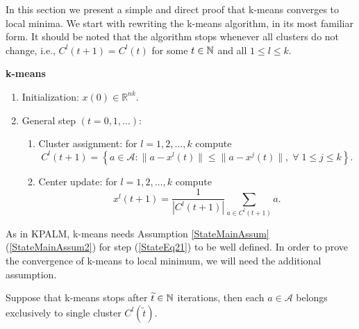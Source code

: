 In this section we present a simple and direct proof that k-means converges to local minima. We start with rewriting the k-means algorithm, in its most familiar form. It should be noted that the algorithm stops whenever all clusters do not change, i.e., $C^l(t+1)=C^l(t)$ for some $t \in \mathbb{N}$ and all $1 \leq l \leq k$.
\clearpage
\begin{framed}
\noindent \textbf{k-means}
\begin{enumerate}[(1)]
	\item Initialization: $x(0) \in \mathbb{R}^{nk}$.
	\item General step $\left( t=0,1, \ldots \right)$:
	\begin{enumerate}[(2.1)]
		\item Cluster assignment: for $l=1, 2, \ldots ,k$ compute
		\begin{equation}
			C^l(t+1) = \left\lbrace a \in \mathcal{A} : \| a - x^l(t) \| \leq \|a - x^j(t) \|, \; \forall \; 1 \leq j \leq k \right\rbrace. \label{StateEq20}
		\end{equation}
		\item Center update: for $l=1, 2, \ldots ,k$ compute
		\begin{equation}
			x^l(t+1) = \frac{1}{\left| C^l(t+1) \right|} \sum\limits_{a \in C^l(t+1)} a . \label{StateEq21}
		\end{equation}
	\end{enumerate}
\end{enumerate}
\end{framed}

As in KPALM, k-means needs Assumption \ref{StateMainAssum}(\ref{StateMainAssum2}) for step (\ref{StateEq21}) to be well defined. In order to prove the convergence of k-means to local minimum, we will need the additional assumption.

\begin{assumption} \label{StateEq23}
Suppose that k-means stops after $\widetilde{t} \in \mathbb{N}$ iterations, then each $a \in \mathcal{A}$ belongs exclusively to single cluster $C^l(\widetilde{t})$.
\end{assumption}

